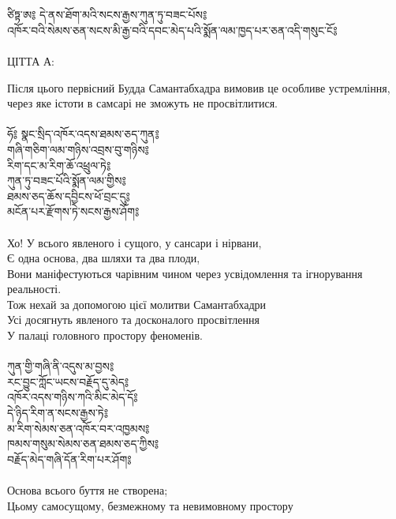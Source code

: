 
\\
\\
{\ti
ཙིཏྟ་ཨ༔ དེ་ནས་ཐོག་མའི་སངས་རྒྱས་ཀུན་ཏུ་བཟང་པོས༔\\
འཁོར་བའི་སེམས་ཅན་སངས་མི་རྒྱ་བའི་དབང་མེད་པའི་སྨོན་ལམ་ཁྱད་པར་ཅན་འདི་གསུང་ངོ༔}\\
\\
ЦІТТА А:

Після цього первісний Будда Самантабхадра вимовив 
це особливе устремління, через яке істоти в самсарі
не зможуть не просвітлитися.\\
\\
{\ti
ཧོ༔ སྣང་སྲིད་འཁོར་འདས་ཐམས་ཅད་ཀུན༔\\
གཞི་གཅིག་ལམ་གཉིས་འབྲས་བུ་གཉིས༔ \\
རིག་དང་མ་རིག་ཆོ་འཕྲུལ་ཏེ༔ \\
ཀུན་ཏུ་བཟང་པོའི་སྨོན་ལམ་གྱིས༔ \\
ཐམས་ཅད་ཆོས་དབྱིངས་ཕོ་བྲང་དུ༔ \\
མངོན་པར་རྫོགས་ཏེ་སངས་རྒྱས་ཤོག༔ }\\
\\
Хо! У всього явленого і сущого, у сансари і нірвани, \\
Є одна основа, два шляхи та два плоди, \\
Вони маніфестуються чарівним чином через усвідомлення та ігнорування реальності. \\
Тож нехай за допомогою цієї молитви Самантабхадри \\
Усі досягнуть явленого та досконалого просвітлення \\
У палаці головного простору феноменів. \\
\newpage
\\
{\ti
ཀུན་གྱི་གཞི་ནི་འདུས་མ་བྱས༔\\
རང་བྱུང་ཀློང་ཡངས་བརྗོད་དུ་མེད༔\\
འཁོར་འདས་གཉིས་ཀའི་མིང་མེད་དོ༔\\
དེ་ཉིད་རིག་ན་སངས་རྒྱས་ཏེ༔\\
མ་རིག་སེམས་ཅན་འཁོར་བར་འཁྱམས༔\\
ཁམས་གསུམ་སེམས་ཅན་ཐམས་ཅད་ཀྱིས༔\\
བརྗོད་མེད་གཞི་དོན་རིག་པར་ཤོག༔}\\
\\
Основа всього буття не створена; \\
Цьому самосущому, безмежному та невимовному простору \\

